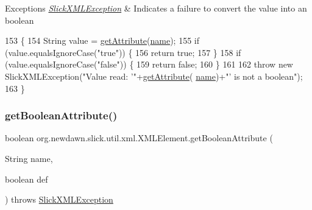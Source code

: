 \begin{DoxyExceptions}{Exceptions}
{\em \mbox{\hyperlink{classorg_1_1newdawn_1_1slick_1_1util_1_1xml_1_1_slick_x_m_l_exception}{Slick\+X\+M\+L\+Exception}}} & Indicates a failure to convert the value into an boolean \\
\hline
\end{DoxyExceptions}

\begin{DoxyCode}
153                                                                              \{
154         String value = \mbox{\hyperlink{classorg_1_1newdawn_1_1slick_1_1util_1_1xml_1_1_x_m_l_element_a49543d209f2f2709c8e7a88fac034c69}{getAttribute}}(\mbox{\hyperlink{classorg_1_1newdawn_1_1slick_1_1util_1_1xml_1_1_x_m_l_element_aa96123a88e2614952c4d3d1a4207560a}{name}});
155         \textcolor{keywordflow}{if} (value.equalsIgnoreCase(\textcolor{stringliteral}{"true"})) \{
156             \textcolor{keywordflow}{return} \textcolor{keyword}{true};
157         \}
158         \textcolor{keywordflow}{if} (value.equalsIgnoreCase(\textcolor{stringliteral}{"false"})) \{
159             \textcolor{keywordflow}{return} \textcolor{keyword}{false};
160         \}
161         
162         \textcolor{keywordflow}{throw} \textcolor{keyword}{new} SlickXMLException(\textcolor{stringliteral}{"Value read: '"}+\mbox{\hyperlink{classorg_1_1newdawn_1_1slick_1_1util_1_1xml_1_1_x_m_l_element_a49543d209f2f2709c8e7a88fac034c69}{getAttribute}}(
      \mbox{\hyperlink{classorg_1_1newdawn_1_1slick_1_1util_1_1xml_1_1_x_m_l_element_aa96123a88e2614952c4d3d1a4207560a}{name}})+\textcolor{stringliteral}{"' is not a boolean"});
163     \}
\end{DoxyCode}
\mbox{\label{classorg_1_1newdawn_1_1slick_1_1util_1_1xml_1_1_x_m_l_element_adc7a26e07efa028c69d4cd1e5d1da019}} 
\subsubsection{\texorpdfstring{get\+Boolean\+Attribute()}{getBooleanAttribute()}\hspace{0.1cm}{\footnotesize\ttfamily [2/2]}}
{\footnotesize\ttfamily boolean org.\+newdawn.\+slick.\+util.\+xml.\+X\+M\+L\+Element.\+get\+Boolean\+Attribute (\begin{DoxyParamCaption}\item[{String}]{name,  }\item[{boolean}]{def }\end{DoxyParamCaption}) throws \mbox{\hyperlink{classorg_1_1newdawn_1_1slick_1_1util_1_1xml_1_1_slick_x_m_l_exception}{Slick\+X\+M\+L\+Exception}}\hspace{0.3cm}{\ttfamily [inline]}}

